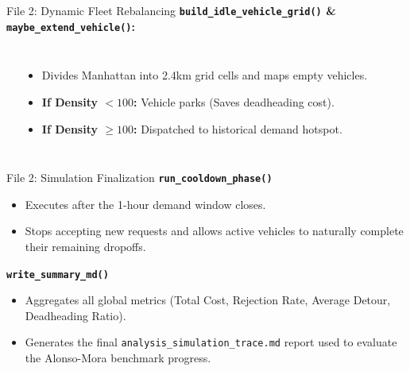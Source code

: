 \documentclass{beamer}
\begin{document}
\begin{frame}{File 2: Dynamic Fleet Rebalancing}
  \textbf{\texttt{build\_idle\_vehicle\_grid()} \& \texttt{maybe\_extend\_vehicle()}:}
  \begin{columns}
  \begin{center}
  \end{center}
  
  \begin{itemize}
      \item Divides Manhattan into 2.4km grid cells and maps empty vehicles.
      \item \textbf{If Density $< 100$:} Vehicle parks (Saves deadheading cost).
      \item \textbf{If Density $\geq 100$:} Dispatched to historical demand hotspot.
  \end{itemize}
  \end{columns}
\end{frame}

\begin{frame}{File 2: Simulation Finalization}
  \textbf{\texttt{run\_cooldown\_phase()}}
  \begin{itemize}
      \item Executes after the 1-hour demand window closes.
      \item Stops accepting new requests and allows active vehicles to naturally complete their remaining dropoffs.
  \end{itemize}
  \vspace{0.3cm}
  \textbf{\texttt{write\_summary\_md()}}
  \begin{itemize}
      \item Aggregates all global metrics (Total Cost, Rejection Rate, Average Detour, Deadheading Ratio).
      \item Generates the final \texttt{analysis\_simulation\_trace.md} report used to evaluate the Alonso-Mora benchmark progress.
  \end{itemize}
\end{frame}
\end{document}
